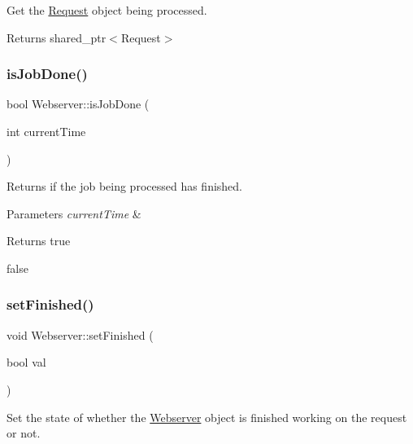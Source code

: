 Get the \hyperlink{classRequest}{Request} object being processed. 

\begin{DoxyReturn}{Returns}
shared\+\_\+ptr$<$\+Request$>$ 
\end{DoxyReturn}
\mbox{\label{classWebserver_a25d0b2f418c84058bb49408aacee9745}} 
\subsubsection{\texorpdfstring{is\+Job\+Done()}{isJobDone()}}
{\footnotesize\ttfamily bool Webserver\+::is\+Job\+Done (\begin{DoxyParamCaption}\item[{int}]{current\+Time }\end{DoxyParamCaption})\hspace{0.3cm}{\ttfamily [inline]}}



Returns if the job being processed has finished. 


\begin{DoxyParams}{Parameters}
{\em current\+Time} & \\
\hline
\end{DoxyParams}
\begin{DoxyReturn}{Returns}
true 

false 
\end{DoxyReturn}
\mbox{\label{classWebserver_a385a32307e09550c301660581bada2e5}} 
\subsubsection{\texorpdfstring{set\+Finished()}{setFinished()}}
{\footnotesize\ttfamily void Webserver\+::set\+Finished (\begin{DoxyParamCaption}\item[{bool}]{val }\end{DoxyParamCaption})\hspace{0.3cm}{\ttfamily [inline]}}



Set the state of whether the \hyperlink{classWebserver}{Webserver} object is finished working on the request or not. 


